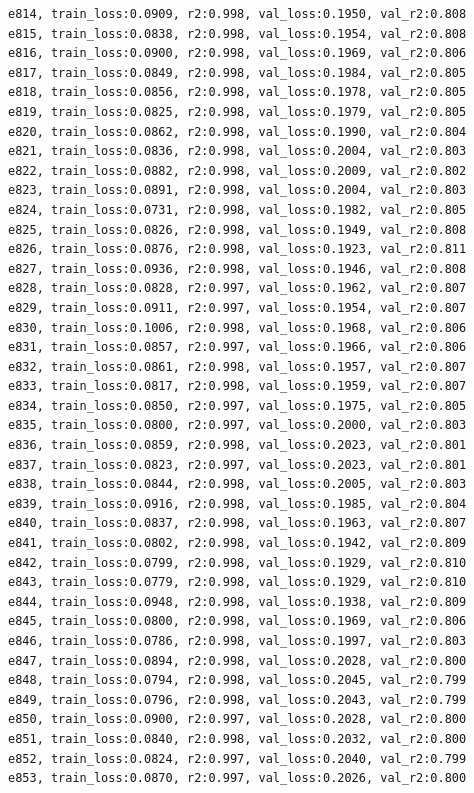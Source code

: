 \documentclass[a4paper, 12pt]{article}
\begin{document}
\begin{lstlisting}
e814, train_loss:0.0909, r2:0.998, val_loss:0.1950, val_r2:0.808
e815, train_loss:0.0838, r2:0.998, val_loss:0.1954, val_r2:0.808
e816, train_loss:0.0900, r2:0.998, val_loss:0.1969, val_r2:0.806
e817, train_loss:0.0849, r2:0.998, val_loss:0.1984, val_r2:0.805
e818, train_loss:0.0856, r2:0.998, val_loss:0.1978, val_r2:0.805
e819, train_loss:0.0825, r2:0.998, val_loss:0.1979, val_r2:0.805
e820, train_loss:0.0862, r2:0.998, val_loss:0.1990, val_r2:0.804
e821, train_loss:0.0836, r2:0.998, val_loss:0.2004, val_r2:0.803
e822, train_loss:0.0882, r2:0.998, val_loss:0.2009, val_r2:0.802
e823, train_loss:0.0891, r2:0.998, val_loss:0.2004, val_r2:0.803
e824, train_loss:0.0731, r2:0.998, val_loss:0.1982, val_r2:0.805
e825, train_loss:0.0826, r2:0.998, val_loss:0.1949, val_r2:0.808
e826, train_loss:0.0876, r2:0.998, val_loss:0.1923, val_r2:0.811
e827, train_loss:0.0936, r2:0.998, val_loss:0.1946, val_r2:0.808
e828, train_loss:0.0828, r2:0.997, val_loss:0.1962, val_r2:0.807
e829, train_loss:0.0911, r2:0.997, val_loss:0.1954, val_r2:0.807
e830, train_loss:0.1006, r2:0.998, val_loss:0.1968, val_r2:0.806
e831, train_loss:0.0857, r2:0.997, val_loss:0.1966, val_r2:0.806
e832, train_loss:0.0861, r2:0.998, val_loss:0.1957, val_r2:0.807
e833, train_loss:0.0817, r2:0.998, val_loss:0.1959, val_r2:0.807
e834, train_loss:0.0850, r2:0.997, val_loss:0.1975, val_r2:0.805
e835, train_loss:0.0800, r2:0.997, val_loss:0.2000, val_r2:0.803
e836, train_loss:0.0859, r2:0.998, val_loss:0.2023, val_r2:0.801
e837, train_loss:0.0823, r2:0.997, val_loss:0.2023, val_r2:0.801
e838, train_loss:0.0844, r2:0.998, val_loss:0.2005, val_r2:0.803
e839, train_loss:0.0916, r2:0.998, val_loss:0.1985, val_r2:0.804
e840, train_loss:0.0837, r2:0.998, val_loss:0.1963, val_r2:0.807
e841, train_loss:0.0802, r2:0.998, val_loss:0.1942, val_r2:0.809
e842, train_loss:0.0799, r2:0.998, val_loss:0.1929, val_r2:0.810
e843, train_loss:0.0779, r2:0.998, val_loss:0.1929, val_r2:0.810
e844, train_loss:0.0948, r2:0.998, val_loss:0.1938, val_r2:0.809
e845, train_loss:0.0800, r2:0.998, val_loss:0.1969, val_r2:0.806
e846, train_loss:0.0786, r2:0.998, val_loss:0.1997, val_r2:0.803
e847, train_loss:0.0894, r2:0.998, val_loss:0.2028, val_r2:0.800
e848, train_loss:0.0794, r2:0.998, val_loss:0.2045, val_r2:0.799
e849, train_loss:0.0796, r2:0.998, val_loss:0.2043, val_r2:0.799
e850, train_loss:0.0900, r2:0.997, val_loss:0.2028, val_r2:0.800
e851, train_loss:0.0840, r2:0.998, val_loss:0.2032, val_r2:0.800
e852, train_loss:0.0824, r2:0.997, val_loss:0.2040, val_r2:0.799
e853, train_loss:0.0870, r2:0.997, val_loss:0.2026, val_r2:0.800

\end{lstlisting}
\end{document}
